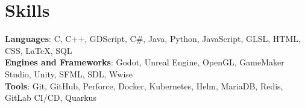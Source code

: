 \documentclass[letterpaper,11pt]{article}
\begin{document}
\section{Skills}
	\begin{itemize}[leftmargin=0.15in, label={}]
	\small{\item{
		\textbf{Languages}{: C, C++, GDScript, C\#, Java, Python, JavaScript, GLSL, HTML, CSS, LaTeX, SQL} \\
		\textbf{Engines and Frameworks}{: Godot, Unreal Engine, OpenGL, GameMaker Studio, Unity, SFML, SDL, Wwise} \\
		\textbf{Tools}{: Git, GitHub, Perforce, Docker, Kubernetes, Helm, MariaDB, Redis, GitLab CI/CD, Quarkus}
	}}
	\end{itemize}












\end{document}
